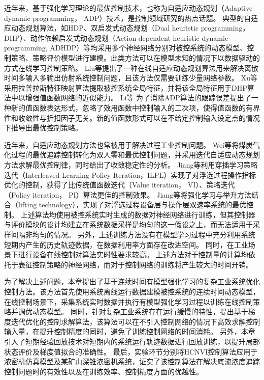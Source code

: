 近年来，基于强化学习\cite{Sutton2018}\cite{F.L.LewisD.Vrabie2012}理论的最优控制技术，也称为自适应动态规划（Adaptive dynamic programming， ADP）\cite{Prokhorov1997}\cite{Werbos2008}\cite{Duan:643}技术，是控制领域研究的热点话题。
典型的自适应动态规划算法，如HDP、双启发式动态规划（Dual heuristic
programming，DHP）、动作依赖启发式动态规划（Action dependent
heuristic dynamic programming,
ADHDP）\cite{Werbos2008}等均采用多个神经网络分别对被控系统的动态模型、控制策略、策略评价模型进行建模。此类方法可以在模型未知的情况下以数据驱动的方式在线学习控制策略。
Liu等\cite{Liu2015}提出了一种在线自适应动态规划算法用来解决离散时间多输入多输出仿射系统控制问题，且该方法仅需要训练少量网络参数。
Xu等\cite{XuX2017}采用拉普拉斯特征映射算法提取被控系统全局特征，并将该全局特征用于DHP算法中以增强值函数网络的近似能力。
Li等\cite{LI2021109687} 为了消除ADP算法的跟踪误差提出了一种新的值函数表达形式，忽略了效用函数中控制输入的二次项，使得值函数的有界性和收敛性与折扣因子无关。新的值函数形式可以在不给定控制输入设定点的情况下推导出最优控制策略。

近年来，自适应动态规划方法也常被用于解决过程工业控制问题。
Wei等\cite{Wei2014}将煤炭气化过程的最优追踪控制转化为双人零和最优控制问题，并采用迭代自适应动态规划方法求解最优控制律，同时给出了收敛稳定性的分析。
Jiang等\cite{Jiang2018}利用穿插学习策略迭代（Interleaved Learning
Policy Iteration，ILPL）实现了对浮选过程操作指标优化的控制，获得了比传统值函数迭代（Value iteration， VI）、策略迭代（Policy iteration， PI）算法更佳的控制效果。
Jiang等\cite{Jiang2019}将强化学习与举升方法结合（lifting technology），实现了对浮选过程设备层与操作层双速率系统的最优控制。
上述算法均使用被控系统实时生成的数据对神经网络进行训练，但其控制器与评价模块的设计均建立在系统数据采样是均匀的这一假设之上，而无法适用于采样间隔非均匀的情况。
另外，上述训练方法没有在模型学习过程中充分利用系统短期内产生的历史轨迹数据，在数据利用率方面存在改进空间。
同时，在工业场景下进行设备在线控制对算法实时性要求较高。
上述方法对于控制量的计算均依托于表征控制策略的神经网络，而对于控制网络的训练将产生较大的时间开销。

为了解决上述问题，本章提出了基于连续时间有模型强化学习的复杂工业系统优化控制方法。该方法首先使用系统离线运行数据建模被控系统的连续时间动态模型，
在线控制场景下，采集系统实时数据并执行有模型强化学习过程以训练在线控制策略并调优动态模型。
同时，针对复杂工业系统存在运行缓慢的特性，提出基于梯度迭代优化的控制求解算法，该算法可以在不引入控制网络的情况下高效求解控制输入量，在提升控制精度的同时，避免了训练控制网络的时间消耗。
另外，本章引入了短期经验回放技术\cite{Modares2014}\cite{Mnih2013}对短期内的系统运行轨迹数据进行回放训练，以提升局部状态评价及梯度值拟合的准确性。
最后，实验环节分别将HCNVI控制算法应用于浓密机仿真模型及某矿山深锥浓密机系统，证实了该控制算法在解决底流浓度追踪控制问题时的有效性以及在训练效率、控制精度方面的优越性。




